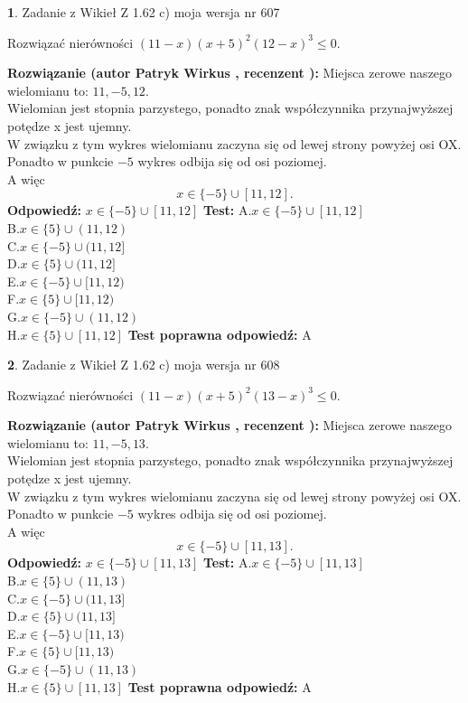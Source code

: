 \documentclass[12pt, a4paper]{article}
\theoremstyle{definition} %
\newtheorem{zad}{}
\newcommand{\zadStart}[1]{\begin{zad}#1\newline}
\newcommand{\zadStop}{\end{zad}}
\newcommand{\rozwStart}[2]{\noindent \textbf{Rozwiązanie (autor #1 , recenzent #2): }\newline}
\newcommand{\rozwStop}{\newline}
\newcommand{\odpStart}{\noindent \textbf{Odpowiedź:}\newline}
\newcommand{\odpStop}{\newline}
\newcommand{\testStart}{\noindent \textbf{Test:}\newline}
\newcommand{\testStop}{\newline}
\newcommand{\kluczStart}{\noindent \textbf{Test poprawna odpowiedź:}\newline}
\newcommand{\kluczStop}{\newline}
\begin{document}
\zadStart{Zadanie z Wikieł Z 1.62 c) moja wersja nr 607}

Rozwiązać nierówności $(11-x)(x+5)^{2}(12-x)^{3}\le0$.
\zadStop
\rozwStart{Patryk Wirkus}{}
Miejsca zerowe naszego wielomianu to: $11, -5, 12$.\\
Wielomian jest stopnia parzystego, ponadto znak współczynnika przy\linebreak najwyższej potędze x jest ujemny.\\ W związku z tym wykres wielomianu zaczyna się od lewej strony powyżej osi OX.\\
Ponadto w punkcie $-5$ wykres odbija się od osi poziomej.\\
A więc $$x \in \{-5\} \cup [11,12].$$
\rozwStop
\odpStart
$x \in \{-5\} \cup [11,12]$
\odpStop
\testStart
A.$x \in \{-5\} \cup [11,12]$\\
B.$x \in \{5\} \cup (11,12)$\\
C.$x \in \{-5\} \cup (11,12]$\\
D.$x \in \{5\} \cup (11,12]$\\
E.$x \in \{-5\} \cup [11,12)$\\
F.$x \in \{5\} \cup [11,12)$\\
G.$x \in \{-5\} \cup (11,12)$\\
H.$x \in \{5\} \cup [11,12]$
\testStop
\kluczStart
A
\kluczStop



\zadStart{Zadanie z Wikieł Z 1.62 c) moja wersja nr 608}

Rozwiązać nierówności $(11-x)(x+5)^{2}(13-x)^{3}\le0$.
\zadStop
\rozwStart{Patryk Wirkus}{}
Miejsca zerowe naszego wielomianu to: $11, -5, 13$.\\
Wielomian jest stopnia parzystego, ponadto znak współczynnika przy\linebreak najwyższej potędze x jest ujemny.\\ W związku z tym wykres wielomianu zaczyna się od lewej strony powyżej osi OX.\\
Ponadto w punkcie $-5$ wykres odbija się od osi poziomej.\\
A więc $$x \in \{-5\} \cup [11,13].$$
\rozwStop
\odpStart
$x \in \{-5\} \cup [11,13]$
\odpStop
\testStart
A.$x \in \{-5\} \cup [11,13]$\\
B.$x \in \{5\} \cup (11,13)$\\
C.$x \in \{-5\} \cup (11,13]$\\
D.$x \in \{5\} \cup (11,13]$\\
E.$x \in \{-5\} \cup [11,13)$\\
F.$x \in \{5\} \cup [11,13)$\\
G.$x \in \{-5\} \cup (11,13)$\\
H.$x \in \{5\} \cup [11,13]$
\testStop
\kluczStart
A
\kluczStop
\end{document}
